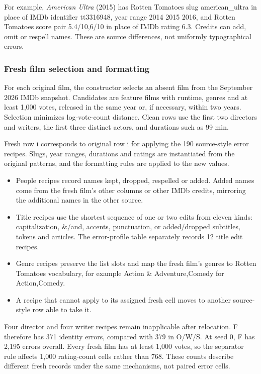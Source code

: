 \documentclass[10pt,a4paper]{article}
\begin{document}
For example, \emph{American Ultra} (2015) has Rotten Tomatoes slug {\ttfamily\small american\_\allowbreak{}ultra} in place of IMDb identifier {\ttfamily\small tt3316948}, year range {\ttfamily\small 2014 2015 2016}, and Rotten Tomatoes score pair {\ttfamily\small 5.4/\allowbreak{}10,6/\allowbreak{}10} in place of IMDb rating 6.3. Credits can add, omit or respell names. These are source differences, not uniformly typographical errors.

\subsubsection{Fresh film selection and formatting}

For each original film, the constructor selects an absent film from the September 2026 IMDb snapshot. Candidates are feature films with runtime, genres and at least 1,000 votes, released in the same year or, if necessary, within two years. Selection minimizes log-vote-count distance. Clean rows use the first two directors and writers, the first three distinct actors, and durations such as {\ttfamily\small 99 min}.

Fresh row i corresponds to original row i for applying the 190 source-style error recipes. Slugs, year ranges, durations and ratings are instantiated from the original patterns, and the formatting rules are applied to the new values.

\begin{itemize}
\item People recipes record names kept, dropped, respelled or added. Added names come from the fresh film's other columns or other IMDb credits, mirroring the additional names in the other source.
\item Title recipes use the shortest sequence of one or two edits from eleven kinds: capitalization, {\ttfamily\small \&}/{\ttfamily\small and}, accents, punctuation, or added/dropped subtitles, tokens and articles. The error-profile table separately records 12 title edit recipes.
\item Genre recipes preserve the list slots and map the fresh film's genres to Rotten Tomatoes vocabulary, for example {\ttfamily\small Action \& Adventure,Comedy} for {\ttfamily\small Action,Comedy}.
\item A recipe that cannot apply to its assigned fresh cell moves to another source-style row able to take it.
\end{itemize}

Four director and four writer recipes remain inapplicable after relocation. F therefore has 371 identity errors, compared with 379 in O/W/S. At seed 0, F has 2,195 errors overall. Every fresh film has at least 1,000 votes, so the separator rule affects 1,000 rating-count cells rather than 768. These counts describe different fresh records under the same mechanisms, not paired error cells.
\end{document}
